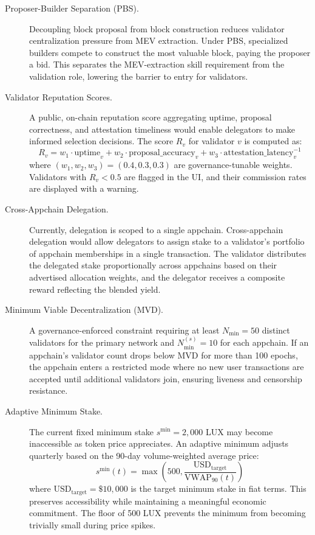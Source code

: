 \begin{description}
    \item[Proposer-Builder Separation (PBS).] Decoupling block proposal from block construction reduces validator centralization pressure from MEV extraction. Under PBS, specialized builders compete to construct the most valuable block, paying the proposer a bid. This separates the MEV-extraction skill requirement from the validation role, lowering the barrier to entry for validators.

    \item[Validator Reputation Scores.] A public, on-chain reputation score aggregating uptime, proposal correctness, and attestation timeliness would enable delegators to make informed selection decisions. The score $R_v$ for validator $v$ is computed as:
    \begin{equation}
        R_v = w_1 \cdot \text{uptime}_v + w_2 \cdot \text{proposal\_accuracy}_v + w_3 \cdot \text{attestation\_latency}_v^{-1}
    \end{equation}
    where $(w_1, w_2, w_3) = (0.4, 0.3, 0.3)$ are governance-tunable weights. Validators with $R_v < 0.5$ are flagged in the UI, and their commission rates are displayed with a warning.

    \item[Cross-Appchain Delegation.] Currently, delegation is scoped to a single appchain. Cross-appchain delegation would allow delegators to assign stake to a validator's portfolio of appchain memberships in a single transaction. The validator distributes the delegated stake proportionally across appchains based on their advertised allocation weights, and the delegator receives a composite reward reflecting the blended yield.

    \item[Minimum Viable Decentralization (MVD).] A governance-enforced constraint requiring at least $N_{\min} = 50$ distinct validators for the primary network and $N_{\min}^{(s)} = 10$ for each appchain. If an appchain's validator count drops below MVD for more than 100 epochs, the appchain enters a restricted mode where no new user transactions are accepted until additional validators join, ensuring liveness and censorship resistance.

    \item[Adaptive Minimum Stake.] The current fixed minimum stake $s^{\min} = 2{,}000$ LUX may become inaccessible as token price appreciates. An adaptive minimum adjusts quarterly based on the 90-day volume-weighted average price:
    \begin{equation}
        s^{\min}(t) = \max\!\left(500, \frac{\text{USD}_{\text{target}}}{\text{VWAP}_{90}(t)}\right)
    \end{equation}
    where $\text{USD}_{\text{target}} = \$10{,}000$ is the target minimum stake in fiat terms. This preserves accessibility while maintaining a meaningful economic commitment. The floor of 500 LUX prevents the minimum from becoming trivially small during price spikes.


\end{description}
